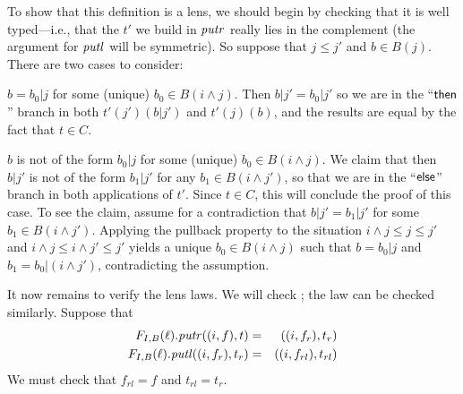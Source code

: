 \begin{defn}[$R$-similarity]
\begin{theorem}
\begin{lemma}
\begin{theorem}[No products]
\begin{lemma}
\begin{defn}
\begin{theorem}
\begin{corollary}[Hylomorphism]
\begin{defn}
\iffull
\begin{goodlens}
To show that this definition is a lens, we should begin by checking   that it
is well typed---i.e., that the $t'$ we build in $\mathit{putr}$ really lies in the
complement (the argument for $\mathit{putl}$ will be symmetric).
%
So suppose that $j\leq{}j'$ and $b{\in}B(j)$.  There are two cases to consider:
\begin{longenum}
\item $b=b_0|j$ for some (unique) $b_0{\in}B(i{\wedge}j)$. Then $b|j' = b_0|j'$
so we are in the ``$\mathsf{then}$'' branch in both $t'(j')(b|j')$ and
$t'(j)(b)$, and the results are equal by the fact that $t \in C$.
%

\item $b$ is not of the form $b_0|j$ for some (unique)
$b_0{\in}B(i{\wedge}j)$. We claim that then $b|j'$ is not of the form
$b_1|j'$ for any $b_1{\in}B(i{\wedge}j')$, so that we are in the
``$\mathsf{else}$'' branch in both applications of $t'$. Since $t \in C$, this
will conclude the proof of this case. To see the claim, assume for a
contradiction that $b|j' = b_1|j'$ for some $b_1{\in}B(i{\wedge}j')$.
Applying the pullback property to the situation $i{\wedge}j \leq{} j \leq{}
j'$ and $i{\wedge}j \leq{} i{\wedge}j' \leq{} j'$ yields a unique
$b_0{\in}B(i{\wedge}j)$ such that $b=b_0|j$ and $b_1=b_0|(i{\wedge}j')$,
contradicting the assumption.
\end{longenum}
It now remains to verify the lens laws. We will check ; the
 law can be checked similarly. Suppose that
\begin{eqnarray*}
    F_{I,B}(\ell).\mathit{putr}((i,f),t) &=& ((i,f_r),t_r) \\
    F_{I,B}(\ell).\mathit{putl}((i,f_r),t_r) &=& ((i,f_{rl}),t_{rl})
\end{eqnarray*}
We must check that $f_{rl}=f$ and $t_{rl}=t_r$.


\end{goodlens}
\end{defn}
\end{corollary}
\end{theorem}
\end{defn}
\end{lemma}
\end{theorem}
\end{lemma}
\end{theorem}
\end{defn}

